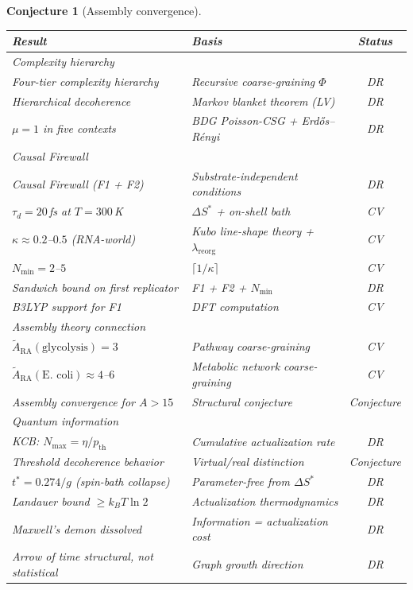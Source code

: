 \documentclass[11pt]{article}
\newtheorem{conjecture}{Conjecture}
\begin{document}
\begin{conjecture}[Assembly convergence]
\begin{center}
\begin{tabular}{llc}
\toprule
Result & Basis & Status \\
\midrule
\multicolumn{3}{l}{\textit{Complexity hierarchy}} \\
Four-tier complexity hierarchy & Recursive coarse-graining $\Phi$ & DR \\
Hierarchical decoherence & Markov blanket theorem (LV) & DR \\
$\mu=1$ in five contexts & BDG Poisson-CSG + Erd\H{o}s--R\'enyi & DR \\
\midrule
\multicolumn{3}{l}{\textit{Causal Firewall}} \\
Causal Firewall (F1 + F2) & Substrate-independent conditions & DR \\
$\tau_d=20$\,fs at $T=300$\,K & $\Delta S^*$ + on-shell bath & CV \\
$\kappa\approx 0.2$--$0.5$ (RNA-world) & Kubo line-shape theory + $\lambda_{\mathrm{reorg}}$ & CV \\
$N_{\min}=2$--$5$ & $\lceil 1/\kappa\rceil$ & CV \\
Sandwich bound on first replicator & F1 + F2 + $N_{\min}$ & DR \\
B3LYP support for F1 & DFT computation & CV \\
\midrule
\multicolumn{3}{l}{\textit{Assembly theory connection}} \\
$\tilde{A}_{\mathrm{RA}}(\text{glycolysis})=3$ & Pathway coarse-graining & CV \\
$\tilde{A}_{\mathrm{RA}}(\text{E. coli})\approx 4$--$6$ & Metabolic network coarse-graining & CV \\
Assembly convergence for $A>15$ & Structural conjecture & Conjecture \\
\midrule
\multicolumn{3}{l}{\textit{Quantum information}} \\
KCB: $N_{\max}=\eta/p_{\mathrm{th}}$ & Cumulative actualization rate & DR \\
Threshold decoherence behavior & Virtual/real distinction & Conjecture \\
$t^*=0.274/g$ (spin-bath collapse) & Parameter-free from $\Delta S^*$ & DR \\
Landauer bound $\geq k_B T \ln 2$ & Actualization thermodynamics & DR \\
Maxwell's demon dissolved & Information = actualization cost & DR \\
Arrow of time structural, not statistical & Graph growth direction & DR \\

\end{tabular}
\end{center}
\end{conjecture}
\end{document}
